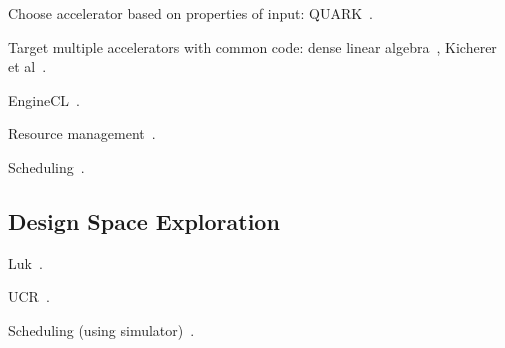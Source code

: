 Choose accelerator based on properties of input:
QUARK~\cite{hcy+14,hjl+15}.

Target multiple accelerators with common code:
dense linear algebra~\cite{daa+15},
Kicherer et al~\cite{knbk12}.



EngineCL~\cite{dng+19}.

Resource management~\cite{bdm+13}.

Scheduling~\cite{kl17,lp17}.

\subsection{Design Space Exploration}

Luk~\cite{ll12,ll11,slkk13}.

UCR~\cite{bbg13}.

Scheduling (using simulator)~\cite{blby11}.
